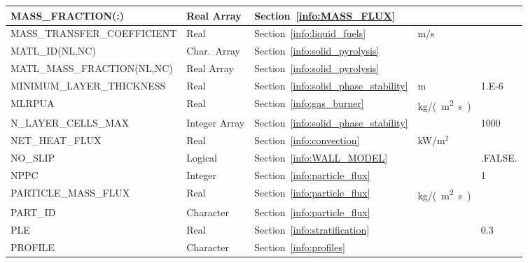 \documentclass[11pt]{book}
\begin{document}
\begin{longtable}{@{\extracolsep{\fill}}|l|l|l|l|l|}
{\ct MASS\_FRACTION(:)}               & Real Array      & Section~\ref{info:MASS_FLUX}              &                     &                         \\ \hline
{\ct MASS\_TRANSFER\_COEFFICIENT}     & Real            & Section~\ref{info:liquid_fuels}           & m/s                 &                         \\ \hline
{\ct MATL\_ID(NL,NC)}                 & Char.~Array     & Section~\ref{info:solid_pyrolysis}        &                     &                         \\ \hline
{\ct MATL\_MASS\_FRACTION(NL,NC)}     & Real Array      & Section~\ref{info:solid_pyrolysis}        &                     &                         \\ \hline
{\ct MINIMUM\_LAYER\_THICKNESS}       & Real            & Section~\ref{info:solid_phase_stability}  & m                   & 1.E-6                   \\ \hline
{\ct MLRPUA }                         & Real            & Section~\ref{info:gas_burner}             & \si{kg/(m^2.s)}     &                         \\ \hline
{\ct N\_LAYER\_CELLS\_MAX}            & Integer Array   & Section~\ref{info:solid_phase_stability}  &                     & 1000                    \\ \hline
{\ct NET\_HEAT\_FLUX}                 & Real            & Section~\ref{info:convection}             & kW/m$^2$            &                         \\ \hline
{\ct NO\_SLIP}                        & Logical         & Section~\ref{info:WALL_MODEL}             &                     & {\ct .FALSE.}           \\ \hline
{\ct NPPC}                            & Integer         & Section~\ref{info:particle_flux}          &                     & 1                       \\ \hline
{\ct PARTICLE\_MASS\_FLUX}            & Real            & Section~\ref{info:particle_flux}          & \si{kg/(m^2.s)}     &                         \\ \hline
{\ct PART\_ID}                        & Character       & Section~\ref{info:particle_flux}          &                     &                         \\ \hline
{\ct PLE}                             & Real            & Section~\ref{info:stratification}         &                     & 0.3                     \\ \hline
{\ct PROFILE}                         & Character       & Section~\ref{info:profiles}               &                     &                         \\ \hline

\end{longtable}
\end{document}
